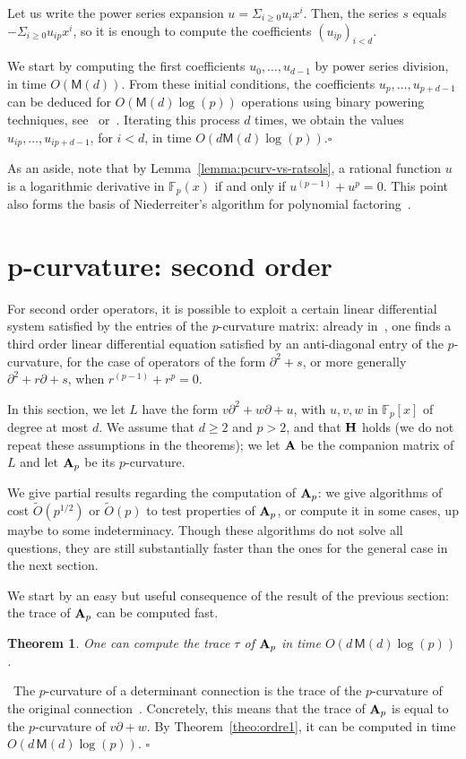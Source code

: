 \documentclass{sig-alternate}
\newcommand{\bigOsoft}{\tilde{O}}
\def\F {\mathbb{F}}
\def\M{\ensuremath{\mathsf{M}}}
\def\mA {\ensuremath{{\bf A}}}
\def\myproof{\noindent{\sc Proof.}~}
\def\foorp{\hfill$\square$}
\newtheorem{theorem}{Theorem}
\begin{document}
Let us write the power series expansion $u =\Sigma_{i \ge 0} u_i
x^i$. Then, the series $s$ equals $-\Sigma_{i \ge 0} u_{ip}x^i$, so it
is enough to compute the coefficients $(u_{ip})_{i < d}$.

We start by computing the first coefficients $u_0,\dots,u_{d-1}$ by
power series division, in time $O(\M(d))$. From these initial
conditions, the coefficients $u_p,\dots,u_{p+d-1}$ can be deduced for
$O(\M(d)\log(p))$ operations using binary powering techniques,
see~\cite{Fiduccia85} or~\cite[Sect.~3.3.3]{Bostan03}.  Iterating this
process $d$ times, we obtain the values $u_{ip},\dots,u_{ip+d-1}$, for
$i < d$, in time $O(d\M(d)\log(p))$.\foorp

\smallskip\noindent As an aside, note that by
Lemma~\ref{lemma:pcurv-vs-ratsols}, a rational function $u$ is a
logarithmic derivative in $\F_p(x)$ if and only if $u^{(p-1)} +
u^p=0$.  This point also forms the basis of Niederreiter's algorithm
for polynomial factoring~\cite{Niederreiter93}.



\section{p-curvature: second order}\label{sec:two}

\noindent For second order operators, it is possible to exploit a
certain linear differential system satisfied by the entries of the
$p$-curvature matrix: already in~\cite{Dwork90,vanDerPut96}, one finds
a third order linear differential equation satisfied by an
anti-diagonal entry of the $p$-curvature, for the case of operators of
the form $\partial^2+s$, or more generally $\partial^2+r\partial +s$,
when $r^{(p-1)}+r^p=0$.

In this section, we let $L$ have the form $v\partial^2+w\partial+u$,
with $u,v,w$ in $\F_p[x]$ of degree at most $d$. We assume that $d
\geq 2$ and $p >2$, and that $\bf H$ holds (we do not repeat these
assumptions in the theorems); we let $\mA$ be the companion matrix of
$L$ and let $\mA_p$ be its $p$-curvature.

We give partial results regarding the computation of $\mA_p$: we give
algorithms of cost $\bigOsoft(p^{1/2})$ or $\bigOsoft(p)$ to test
properties of $\mA_p$, or compute it in some cases, up maybe to some
indeterminacy.  Though these algorithms do not solve all questions,
they are still substantially faster than the ones for the general case
in the next section.

\smallskip{} We start by
an easy but useful consequence of the result of the previous
section: the trace of $\mA_p$ can be computed fast.
\begin{theorem}\label{theo:trace}
  One can compute the trace $\tau$ of $\mA_p$ in time
  $O(d\,\M(d)\log(p))$.
\end{theorem}
\myproof The $p$-curvature of a determinant connection is the trace of the
$p$-curvature of the original connection~\cite{Katz82,Voloch00}.  
Concretely, this
means that the trace of $\mA_p$ is equal to the $p$-curvature of $v\partial+w$.
By Theorem~\ref{theo:ordre1}, it can be computed in time
$O(d\,\M(d)\log(p))$.  \foorp
\end{document}
